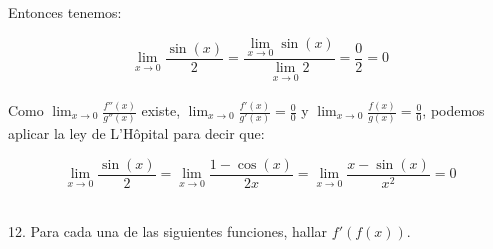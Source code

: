 \documentclass[12pt]{article}
\begin{document}
\begin{enumerate}[\hspace{9px} a)]
        Entonces tenemos:

        \[\displaystyle\lim_{x \to 0}\frac{\sin(x)}{2} = \frac{\displaystyle\lim_{x \to 0}\sin(x)}{\displaystyle\lim_{x \to 0}2} = \frac{0}{2} = 0\]\\

        Como \(\displaystyle\lim_{x \to 0}\frac{f''(x)}{g''(x)}\) existe, \(\displaystyle\lim_{x \to 0}\frac{f'(x)}{g'(x)}=\frac{0}{0}\) y \(\displaystyle\lim_{x \to 0}\frac{f(x)}{g(x)}=\frac{0}{0}\), podemos aplicar la ley de L'H\^opital para decir que:

        \[\displaystyle\lim_{x \to 0}\frac{\sin(x)}{2} = \lim_{x \to 0}\frac{1-\cos(x)}{2x} = \lim_{x \to 0}\frac{x-\sin(x)}{x^2}= 0\]\\

\end{enumerate}

12. Para cada una de las siguientes funciones, hallar $f'(f(x))$.
\end{document}
